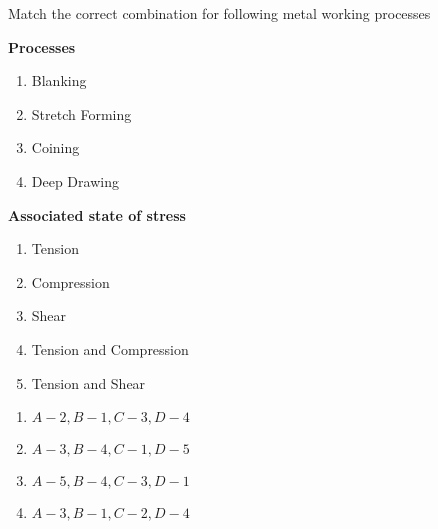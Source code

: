     \item Match the correct combination for following metal working processes
    \begin{multicols}{2}
			\textbf{Processes}
			\begin{enumerate}[label=(\Alph*)]
                
				\item Blanking
				\item Stretch Forming
                    \item Coining
                    \item Deep Drawing
			\end{enumerate}
			\columnbreak
			\textbf{Associated state of stress}
			\begin{enumerate}[label=(\arabic*)]
				\item Tension
				\item Compression
				\item Shear
                    \item Tension and Compression
                    \item Tension and Shear
			\end{enumerate}
		\end{multicols}

      \begin{multicols}{2}
        \begin{enumerate}
            \item $A-2,B-1,C-3,D-4$
            \item $A-3,B-4,C-1,D-5$
            \item $A-5,B-4,C-3,D-1$
            \item $A-3,B-1,C-2,D-4$
        \end{enumerate}
    \end{multicols}

